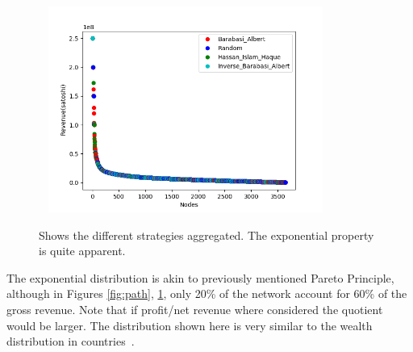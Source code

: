 \begin{figure}[!htb]
	\vspace{-3cm}
	\hspace*{-0.5cm}\
	\centering
	\includegraphics[width=9cm]{images/wealth_distribution_same.png}
	\caption{ Shows the different strategies aggregated. The exponential property is quite apparent.  
	}
	\label{fig:same}
	\hspace*{2mm} 
\end{figure}

The exponential distribution is akin to previously mentioned Pareto Principle, although in Figures \ref{fig:path}, \ref{fig:same}, only 20\% of the network account for 60\% of the gross revenue. Note that if profit/net revenue where considered the quotient would be larger. The distribution shown here is very similar to the wealth distribution in countries~\cite{credit:swiss:distribution}.

